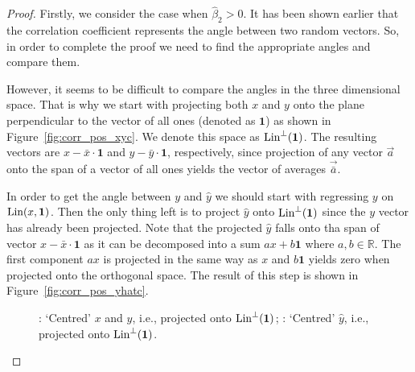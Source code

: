 \begin{proof}
Firstly, we consider the case when $\hat \beta_2 > 0$.
It has been shown earlier that the correlation coefficient represents the angle
between two random vectors.
So, in order to complete the proof we need to find the appropriate angles and compare them.

However, it seems to be difficult to compare the angles in the three dimensional space.
That is why we start with projecting both $x$ and $y$ onto the plane perpendicular to the vector of all ones (denoted as $\mathbf{1}$) as shown in Figure~\ref{fig:corr_pos_xyc}.
We denote this space as $\operatorname{Lin}^{\perp}(\mathbf{1})$. The resulting vectors are $x - \bar x \cdot \mathbf{1}$  and $y - \bar y \cdot \mathbf{1}$, respectively,
since projection of any vector $\vec{a}$ onto the span of a vector of all ones yields the vector of averages $\vec{\bar a}$.


In order to get the angle between $y$ and $\hat y$ we should start with regressing $y$ on $\operatorname{Lin}(x, \mathbf{1})$.
Then the only thing left is to project $\hat y$ onto $\operatorname{Lin}^{\perp}(\mathbf{1})$ since the $y$ vector has already been projected.
Note that the projected $\hat y$ falls onto tha span of vector $x - \bar x \cdot \mathbf{1}$ as it can be decomposed into a sum $a x + b \mathbf{1}$ where $a, b \in \mathbb{R}$.
The first component $a x$ is projected in the same way as $x$ and $b \mathbf{1}$ yields zero when projected onto the orthogonal space.
The result of this step is shown in Figure~\ref{fig:corr_pos_yhatc}.

\begin{figure}[h!]
\begin{center}
\caption{: `Centred' $x$ and $y$, i.e., projected onto $\operatorname{Lin}^{\perp}(\mathbf{1})$; : `Centred' $\hat y$, i.e., projected onto $\operatorname{Lin}^{\perp}(\mathbf{1})$.}
\end{center}
\end{figure}


\end{proof}
